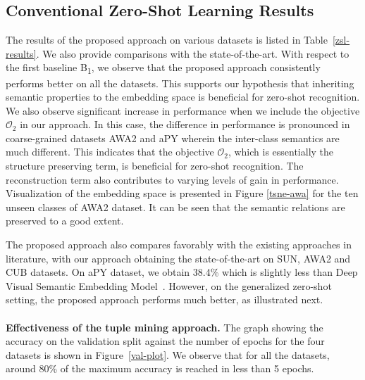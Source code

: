 \documentclass[10pt,twocolumn,letterpaper]{article}
\begin{document}
\subsection{Conventional Zero-Shot Learning Results}
The results of the proposed approach on various datasets is listed in Table~\ref{zsl-results}. 
We also provide comparisons with the state-of-the-art. 
With respect to the first baseline B\textsubscript{1}, we observe that the proposed approach consistently performs better on all the datasets. 
This supports our hypothesis that inheriting semantic properties to the embedding space is beneficial for zero-shot recognition.  
We also observe significant increase in performance when we include the objective $\mathcal{O}_2$ in our approach.
In this case, the difference in performance is pronounced in coarse-grained datasets AWA2 and aPY wherein the inter-class semantics are much different. 
This indicates that the objective $\mathcal{O}_2$, which is essentially the structure preserving term, is beneficial for zero-shot recognition. 
The reconstruction term also contributes to varying levels of gain in performance. Visualization of the embedding space is presented in Figure \ref{tsne-awa} for the ten unseen classes of AWA2 dataset. It can be seen that the semantic relations are preserved to a good extent. 

The proposed approach also compares favorably with the existing approaches in literature, with our approach obtaining the state-of-the-art on SUN, AWA2 and CUB datasets. %
On aPY dataset, we obtain 38.4\% which is slightly less than Deep Visual Semantic Embedding Model~\cite{frome2013devise}. 
However, on the generalized zero-shot setting, the proposed approach performs much better, as illustrated next.\\\\
\textbf{Effectiveness of the tuple mining approach.} The graph showing the accuracy on the validation split against the number of epochs for the four datasets is shown in Figure~\ref{val-plot}. 
We observe that for all the datasets, around 80\% of the maximum accuracy is reached in less than 5 epochs. 
 
\end{document}
